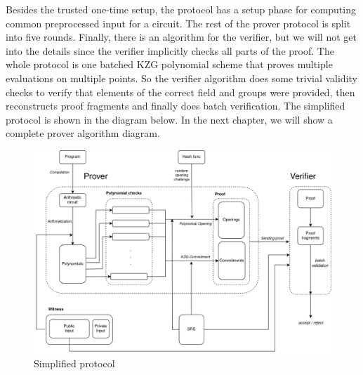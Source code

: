 Besides the trusted one-time setup, the protocol has a setup phase for computing common preprocessed input for a circuit. The rest of the prover protocol is split into five rounds. Finally, there is an algorithm for the verifier, but we will not get into the details since the verifier implicitly checks all parts of the proof. The whole protocol is one batched KZG polynomial scheme that proves multiple evaluations on multiple points. So the verifier algorithm does some trivial validity checks to verify that elements of the correct field and groups were provided, then reconstructs proof fragments and finally does batch verification. The simplified protocol is shown in the diagram below. In the next chapter, we will show a complete prover algorithm diagram. 

\begin{figure}[ht]
    \centering
    \includegraphics[width=1\linewidth]{round-figures/round1/plonk_better_overview.drawio.png}
    \caption{Simplified protocol}
\end{figure}



